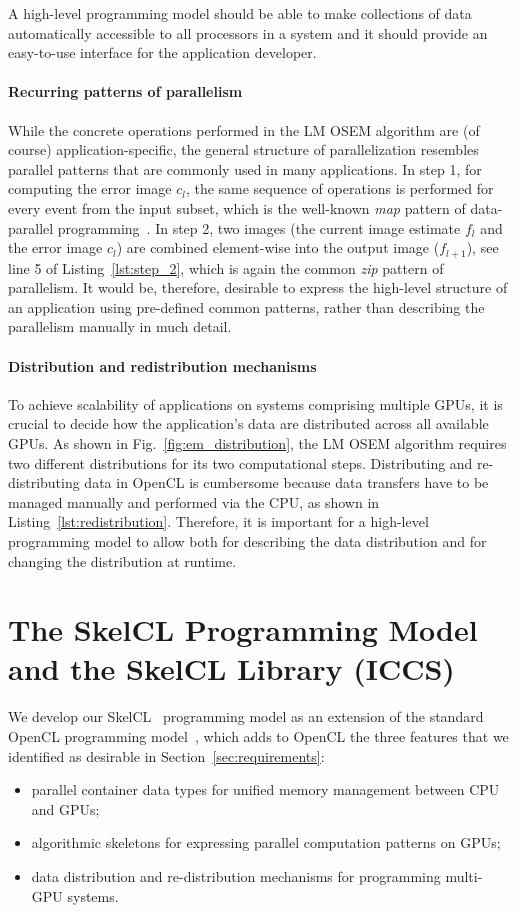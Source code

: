 A high-level programming model should be able to make collections of data automatically accessible to all processors in a system and it should provide an easy-to-use interface for the application developer.

\paragraph{Recurring patterns of parallelism}
While the concrete operations performed in the LM OSEM algorithm are (of course) application-specific, the general structure of parallelization resembles parallel patterns that are commonly used in many applications.
In step 1, for computing the error image $c_l$, the same sequence of operations is performed for every event from the input subset, which is the well-known \emph{map} pattern of data-parallel programming~\cite{gc11}.
In step 2, two images (the current image estimate $f_l$ and the error image $c_l$) are combined element-wise into the output image ($f_{l+1}$), see line 5 of Listing~\ref{lst:step_2}, which is again the common \emph{zip} pattern of parallelism.
It would be, therefore, desirable to express the high-level structure of an application using pre-defined common patterns, rather than describing the parallelism manually in much detail.

\paragraph{Distribution and redistribution mechanisms}
To achieve scalability of applications on systems comprising multiple GPUs, it is crucial to decide how the application's data are distributed across all available GPUs.
As shown in Fig.~\ref{fig:em_distribution}, the LM OSEM algorithm requires two different distributions for its two computational steps.
Distributing and re-distributing data in OpenCL is cumbersome because data transfers have to be managed manually and performed via the CPU, as shown in Listing~\ref{lst:redistribution}.
Therefore, it is important for a high-level programming model to allow both for describing the data distribution and for changing the distribution at runtime.

\section{The SkelCL Programming Model and the SkelCL Library (ICCS)}

We develop our SkelCL~\cite{StKG-11} programming model as an extension of the standard OpenCL programming model~\cite{OpenCL-10}, which adds to OpenCL the three features that we identified as desirable in Section~\ref{sec:requirements}:
\begin{itemize}
  \item parallel container data types for unified memory management between CPU and GPUs;
  \item algorithmic skeletons for expressing parallel computation patterns on GPUs;
  \item data distribution and re-distribution mechanisms for programming multi-GPU systems.
\end{itemize}

